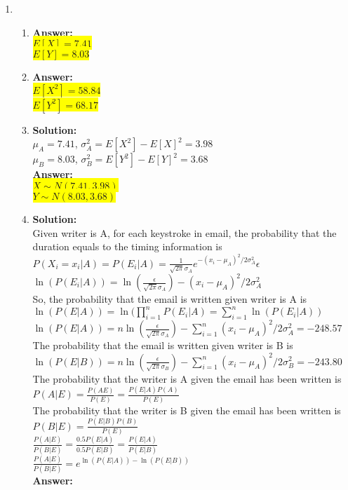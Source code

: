 \documentclass{article}
\newcommand{\myansw}{\textbf{Answer:}\\}
\newcommand{\mysolu}{\textbf{Solution:}\\}
\begin{document}
\begin{enumerate}
	\item
	\begin{enumerate}
		\item
		\myansw
		\colorbox{yellow}{${E[X] = 7.41}$}\\
		\colorbox{yellow}{${E[Y] = 8.03}$}\\
		\item
		\myansw
		\colorbox{yellow}{${E[X^2] = 58.84}$}\\
		\colorbox{yellow}{${E[Y^2] = 68.17}$}\\	
		\item
		\mysolu
		${\mu_A = 7.41}$,	${\sigma_A^2 = E[X^2] - E[X]^2 =  3.98}$\\
		${\mu_B = 8.03}$,	${\sigma_B^2 = E[Y^2] - E[Y]^2 = 3.68}$\\
		\myansw
		\colorbox{yellow}{${X \sim N(7.41, 3.98)}$}\\
		\colorbox{yellow}{${Y \sim N(8.03, 3.68)}$}\\
		\item
		\mysolu
		Given writer is A, for each keystroke in email, the probability that the duration equals to the timing information is
		${P(X_i = x_i|A) =P(E_i|A)= \frac{1}{\sqrt{2\pi}\sigma_A}e^{-(x_i - \mu_A)^2/2\sigma_A^2}\epsilon}$ \\
		${\ln(P(E_i|A)) = \ln(\frac{\epsilon}{\sqrt{2\pi}\sigma_A})-(x_i - \mu_A)^2/2\sigma_A^2}$\\
		So, the probability that the email is written given writer is A is\\
		${\ln(P(E|A)) = \ln(\prod\limits_{i = 1}^{n}P(E_i|A)= \sum\limits_{i = 1}^{n}\ln(P(E_i|A))}$\\
		${\ln(P(E|A)) = n\ln(\frac{\epsilon}{\sqrt{2\pi}\sigma_A}) - \sum\limits_{i = 1}^{n}(x_i - \mu_A)^2/2\sigma_A^2=-248.57}$\\
		The probability that the email is written given writer is B is\\
		${\ln(P(E|B)) = n\ln(\frac{\epsilon}{\sqrt{2\pi}\sigma_B}) - \sum\limits_{i = 1}^{n}(x_i - \mu_A)^2/2\sigma_B^2=-243.80}$\\
		
		The probability that the writer is A given the email has been written is\\
		${P(A|E) = \frac{P(AE)}{P(E)}=\frac{P(E|A)P(A)}{P(E)}}$\\
		The probability that the writer is B given the email has been written is\\
		${P(B|E) = \frac{P(E|B)P(B)}{P(E)}}$\\
		${\frac{P(A|E)}{P(B|E)} = \frac{0.5P(E|A)}{0.5P(E|B)} = \frac{P(E|A)}{P(E|B)}}$\\
		${\frac{P(A|E)}{P(B|E)} = e^{\ln(P(E|A))-\ln(P(E|B))}}$\\
		\myansw
		

\end{enumerate}
\end{enumerate}
\end{document}
